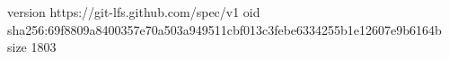 version https://git-lfs.github.com/spec/v1
oid sha256:69f8809a8400357e70a503a949511cbf013c3febe6334255b1e12607e9b6164b
size 1803
